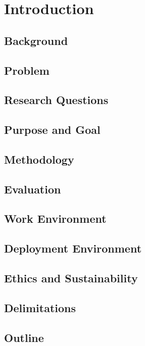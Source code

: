 \chapter{Introduction}


\section{Background}
\section{Problem}
\section{Research Questions}
\section{Purpose and Goal}
\section{Methodology}
\section{Evaluation}
\section{Work Environment}
\section{Deployment Environment}
\section{Ethics and Sustainability}
\section{Delimitations}
\section{Outline}
